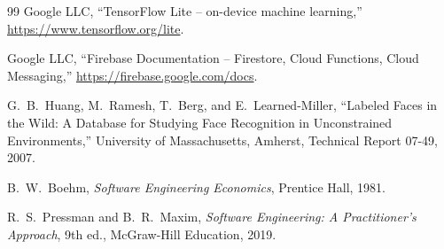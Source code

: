\documentclass[12pt,a4paper,oneside]{report}
\begin{document}
\begin{thebibliography}{99}
Google LLC, ``TensorFlow Lite -- on-device machine learning,''
\url{https://www.tensorflow.org/lite}.

Google LLC, ``Firebase Documentation -- Firestore, Cloud Functions, Cloud
Messaging,'' \url{https://firebase.google.com/docs}.

G.~B.~Huang, M.~Ramesh, T.~Berg, and E.~Learned-Miller, ``Labeled Faces in
the Wild: A Database for Studying Face Recognition in Unconstrained
Environments,'' University of Massachusetts, Amherst, Technical Report
07-49, 2007.

B.~W.~Boehm, \emph{Software Engineering Economics}, Prentice Hall, 1981.

R.~S.~Pressman and B.~R.~Maxim, \emph{Software Engineering: A
Practitioner's Approach}, 9th ed., McGraw-Hill Education, 2019.

\end{thebibliography}
\end{document}
